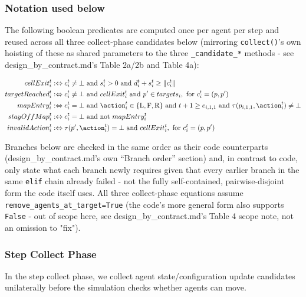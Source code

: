 \subsubsection{Notation used below}

The following boolean predicates are computed once per agent per step and reused across all three collect-phase
candidates below (mirroring \texttt{collect()}'s own hoisting of these as shared parameters to the three
\texttt{\_candidate\_*} methods - see design\_by\_contract.md's Table 2a/2b and Table 4a):

\begin{align*}
cellExit_i^t      &:\Leftrightarrow c_i^t \not= \bot \text{ and } s_i^t > 0 \text{ and } d_i^t + s_i^t \geq \lVert c_i^t \rVert \\
targetReached_i^t &:\Leftrightarrow c_i^t \not= \bot \text{ and } cellExit_i^t \text{ and } p' \in targets_i, \text{ for } c_i^t=(p,p') \\
mapEntry_i^t      &:\Leftrightarrow c_i^t = \bot \text{ and } \action_i^t \in \{\text{L},\text{F},\text{R}\} \text{ and } t+1 \geq e_{i,1,1} \text{ and } \tau(p_{i,1,1},\action_i^t) \not= \bot \\
stayOffMap_i^t    &:\Leftrightarrow c_i^t = \bot \text{ and not } mapEntry_i^t \\
invalidAction_i^t &:\Leftrightarrow \tau(p',\action_i^t) = \bot \text{ and } cellExit_i^t, \text{ for } c_i^t=(p,p')
\end{align*}

Branches below are checked in the same order as their code counterparts (design\_by\_contract.md's own ``Branch
order'' section) and, in contrast to code, only state what each branch newly requires given that every earlier
branch in the same \texttt{elif} chain already failed - not the fully self-contained, pairwise-disjoint form the
code itself uses. All three collect-phase equations assume \texttt{remove\_agents\_at\_target=True} (the code's
more general form also supports \texttt{False} - out of scope here, see design\_by\_contract.md's Table 4 scope
note, not an omission to "fix").

\subsubsection{Step Collect Phase}

In the step collect phase, we collect agent state/configuration update candidates unilaterally before the
simulation checks whether agents can move.

